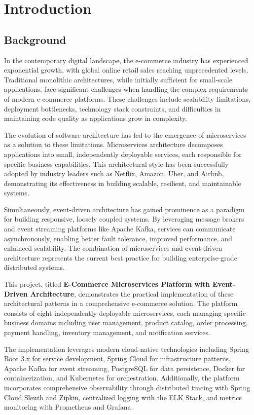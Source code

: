 \chapter{Introduction}

\section{Background}

In the contemporary digital landscape, the e-commerce industry has experienced exponential growth, with global online retail sales reaching unprecedented levels. Traditional monolithic architectures, while initially sufficient for small-scale applications, face significant challenges when handling the complex requirements of modern e-commerce platforms. These challenges include scalability limitations, deployment bottlenecks, technology stack constraints, and difficulties in maintaining code quality as applications grow in complexity.

The evolution of software architecture has led to the emergence of microservices as a solution to these limitations. Microservices architecture decomposes applications into small, independently deployable services, each responsible for specific business capabilities. This architectural style has been successfully adopted by industry leaders such as Netflix, Amazon, Uber, and Airbnb, demonstrating its effectiveness in building scalable, resilient, and maintainable systems.

Simultaneously, event-driven architecture has gained prominence as a paradigm for building responsive, loosely coupled systems. By leveraging message brokers and event streaming platforms like Apache Kafka, services can communicate asynchronously, enabling better fault tolerance, improved performance, and enhanced scalability. The combination of microservices and event-driven architecture represents the current best practice for building enterprise-grade distributed systems.

This project, titled \textbf{E-Commerce Microservices Platform with Event-Driven Architecture}, demonstrates the practical implementation of these architectural patterns in a comprehensive e-commerce solution. The platform consists of eight independently deployable microservices, each managing specific business domains including user management, product catalog, order processing, payment handling, inventory management, and notification services.

The implementation leverages modern cloud-native technologies including Spring Boot 3.x for service development, Spring Cloud for infrastructure patterns, Apache Kafka for event streaming, PostgreSQL for data persistence, Docker for containerization, and Kubernetes for orchestration. Additionally, the platform incorporates comprehensive observability through distributed tracing with Spring Cloud Sleuth and Zipkin, centralized logging with the ELK Stack, and metrics monitoring with Prometheus and Grafana.

